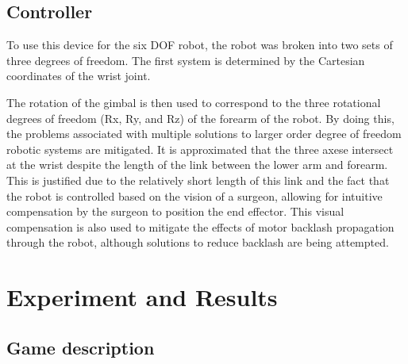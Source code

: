 \documentclass[journal,twoside]{JoPhA}
\begin{document}
% 
%
%
%





\subsection{Controller}
{\color{red}{Hay que adaptar a nuestro sistema}}

To use this device for the six DOF robot, the robot was broken into two 
sets of three degrees of freedom.  The first system is determined by 
the Cartesian coordinates of the wrist joint.  

The  rotation  of  the  gimbal  is  then  used  to  correspond  to  the  three rotational  degrees  of  freedom  (Rx,  Ry,  and  Rz)  of  the  forearm  of  the  robot.    
By  doing  this,  the  problems  associated  with  multiple  solutions  to  larger  order  degree  of  freedom  robotic  systems  are  mitigated.    
It  is  approximated  that  the  three  axese intersect  at  the  wrist despite the length of the link between the lower arm and forearm.  
This is justified due to the relatively short length of this link and the fact that the robot is controlled based on the vision of a surgeon, allowing for intuitive compensation by the surgeon to position the  end  effector.
This  visual  compensation  is  also  used  to  mitigate  the  effects  of  motor backlash propagation through the robot, although solutions to reduce backlash are being attempted.

\section{Experiment and Results}
\label{sec:experiment}

\subsection{Game description}
\end{document}
